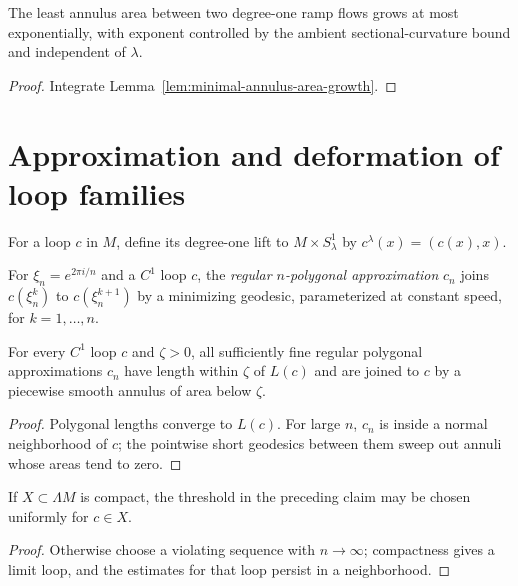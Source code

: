\begin{corollary}
\label{cor:minimal-annulus-exponential-growth}
The least annulus area between two degree-one ramp flows grows at most
exponentially, with exponent controlled by the ambient sectional-curvature
bound and independent of $\lambda$.
\end{corollary}
\begin{proof}
\sketch Integrate Lemma~\ref{lem:minimal-annulus-area-growth}.
\end{proof}

\section{Approximation and deformation of loop families}

For a loop $c$ in $M$, define its degree-one lift to
$M\times S^1_\lambda$ by $c^\lambda(x)=(c(x),x)$.

\begin{definition}
\label{def:n-polygonal-approximation}
For $\xi_n=e^{2\pi i/n}$ and a $C^1$ loop $c$, the \emph{regular
$n$-polygonal approximation} $c_n$ joins
$c(\xi_n^k)$ to $c(\xi_n^{k+1})$ by a minimizing geodesic, parameterized at
constant speed, for $k=1,\ldots,n$.
\end{definition}

\begin{claim}
\label{claim:polygonal-approximation-properties}
\label{onec}
For every $C^1$ loop $c$ and $\zeta>0$, all sufficiently fine regular
polygonal approximations $c_n$ have length within $\zeta$ of $L(c)$ and are
joined to $c$ by a piecewise smooth annulus of area below $\zeta$.
\end{claim}
\begin{proof}
\sketch Polygonal lengths converge to $L(c)$. For large $n$, $c_n$ is inside a
normal neighborhood of $c$; the pointwise short geodesics between them sweep
out annuli whose areas tend to zero.
\end{proof}

\begin{claim}
\label{claim:polygonal-approximation-uniform}
\label{uniformc}
If $X\subset\Lambda M$ is compact, the threshold in the preceding claim may
be chosen uniformly for $c\in X$.
\end{claim}
\begin{proof}
\sketch Otherwise choose a violating sequence with $n\to\infty$; compactness gives a
limit loop, and the estimates for that loop persist in a neighborhood.
\end{proof}

